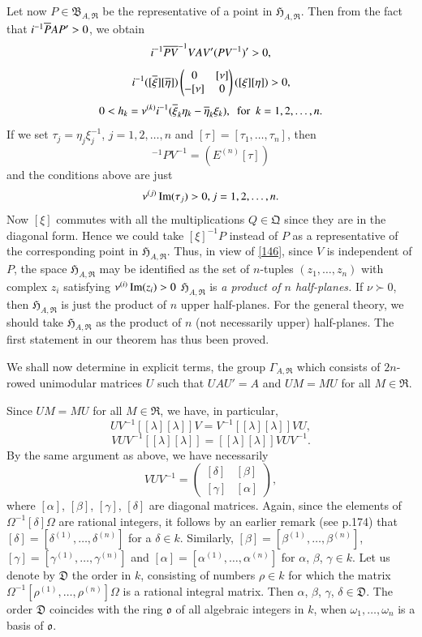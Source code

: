 Let now $P\in\mathfrak{B}_{A,\mathfrak{R}}$ be the representative of a
point in $\mathfrak{H}_{A,\mathfrak{R}}$. Then from the fact that
$i^{-1}\overline{P}AP'>0$, we obtain
$$
i^{-1}\overline{PV}^{-1}VAV'(PV^{-1})'>0,
$$
\ie
$$
i^{-1}([\overline{\xi}][\overline{\eta}])
\begin{pmatrix}
0 & [\nu]\\
-[\nu] & 0
\end{pmatrix}
([\xi][\eta])>0,
$$
\ie
$$
0<h_{k}=\nu^{(k)}i^{-1}(\overline{\xi}_{k}\eta_{k}-\overline{\eta}_{k}\xi_{k}),\text{
  \ for \ } k=1,2,\ldots,n.
$$
If we set $\tau_{j}=\eta_{j}\xi^{-1}_{j}$, $j=1,2,\ldots,n$ and
$[\tau]=[\tau_{1},\ldots,\tau_{n}]$, then
\begin{equation*}
[\xi]^{-1}PV^{-1}=(E^{(n)}[\tau])\tag{146}\label{146}
\end{equation*}
and the conditions above are just 
$$
\nu^{(j)}\operatorname{Im} (\tau_{j})>0, j=1,2,\ldots,n.
$$\pageoriginale
Now $[\xi]$ commutes with all the multiplications $Q\in\mathfrak{Q}$
since they are in the diagonal form. Hence we could take $[\xi]^{-1}P$
instead of $P$ as a representative of the corresponding point in
$\mathfrak{H}_{A,\mathfrak{R}}$. Thus, in view of \eqref{146}, since
$V$ is independent of $P$, the space $\mathfrak{H}_{A,\mathfrak{R}}$
may be identified as the set of $n$-tuples $(z_{1},\ldots,z_{n})$ with
complex $z_{i}$ satisfying $\nu^{(i)}\operatorname{Im} (z_{i})>0$ \ie
$\mathfrak{H}_{A,\mathfrak{R}}$ is {\em a product of $n$ half-planes.}
If $\nu \succ 0$, then $\mathfrak{H}_{A,\mathfrak{R}}$ is just the product
of $n$ upper half-planes. For the general theory, we should take
$\mathfrak{H}_{A,\mathfrak{R}}$ as the product of $n$ (not necessarily
upper) half-planes. The first statement in our theorem has thus been
proved.

We shall now determine in explicit terms, the group
$\Gamma_{A,\mathfrak{R}}$ which consists of $2n$-rowed unimodular
matrices $U$ such that $UAU'=A$ and $UM=MU$ for all
$M\in\mathfrak{R}$.

Since $UM=MU$ for all $M\in\mathfrak{R}$, we have, in particular,
$$
UV^{-1}[[\lambda][\lambda]]V=V^{-1}[[\lambda][\lambda]]VU,
$$
\ie
$$
VUV^{-1}[[\lambda][\lambda]]=[[\lambda][\lambda]]VUV^{-1}.
$$
By the same argument as above, we have necessarily
$$
VUV^{-1}=
\begin{pmatrix}
[\delta] & [\beta]\\
[\gamma] & [\alpha]
\end{pmatrix},
$$
where $[\alpha]$, $[\beta]$, $[\gamma]$, $[\delta]$ are diagonal
matrices. Again, since the elements of $\Omega^{-1}[\delta]\Omega$ are
rational integers, it follows by an earlier remark (see p.\@ 174) that
$[\delta]=[\delta^{(1)},\ldots,\delta^{(n)}]$ for a $\delta\in
k$. Similarly, $[\beta]=[\beta^{(1)},\ldots,\beta^{(n)}]$,
$[\gamma]=[\gamma^{(1)},\ldots,\gamma^{(n)}]$ and
$[\alpha]=[\alpha^{(1)},\ldots,\alpha^{(n)}]$ for $\alpha$, $\beta$,
$\gamma\in k$. Let us denote by $\mathfrak{D}$ the order in $k$,
consisting of numbers $\rho\in k$ for which the matrix
$\Omega^{-1}[\rho^{(1)},\ldots,\rho^{(n)}]\Omega$ is a rational
integral matrix. Then $\alpha$, $\beta$, $\gamma$, $\delta\in
\mathfrak{D}$. The order $\mathfrak{D}$ coincides with the ring
$\mathfrak{o}$ of all algebraic integers in $k$, when
$\omega_{1},\ldots,\omega_{n}$ is a basis of $\mathfrak{o}$.


